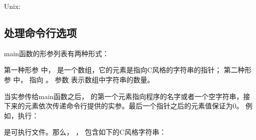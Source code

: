 \documentclass[letterpaper,10pt,english]{sphinxmanual}
\begin{document}
Unix:

%
\begin{sphinxVerbatim}[commandchars=\\\{\}]
 
\end{sphinxVerbatim}


\subsection{处理命令行选项}
\label{\detokenize{cpp/01_main:id2}}
main函数的形参列表有两种形式：

%
\begin{sphinxVerbatim}[commandchars=\\\{\}]
    \PYG{p}{[}\PYG{p}{]}  

      
\end{sphinxVerbatim}

第一种形参  中， 是一个数组，它的元素是指向C风格的字符串的指针；
第二种形参  中， 指向  。
参数  表示数组中字符串的数量。

当实参传给main函数之后， 的第一个元素指向程序的名字或者一个空字符串，接下来的元素依次传递命令行提供的实参。最后一个指针之后的元素值保证为0。
例如，执行：

%
\begin{sphinxVerbatim}[commandchars=\\\{\}]
    
\end{sphinxVerbatim}

 是可执行文件。那么，  ， 包含如下的C风格字符串：
\end{document}
